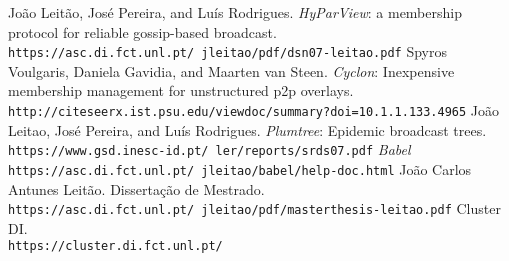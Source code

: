 

\begin{thebibliography}{9}

João Leitão, José Pereira, and Luís Rodrigues. 
\textit{HyParView}: a membership protocol for reliable gossip-based broadcast.
\\\texttt{https://asc.di.fct.unl.pt/~jleitao/pdf/dsn07-leitao.pdf}
Spyros Voulgaris, Daniela Gavidia, and Maarten van Steen. 
\textit{Cyclon}: Inexpensive membership management for unstructured p2p overlays.
\\\texttt{http://citeseerx.ist.psu.edu/viewdoc/summary?doi=10.1.1.133.4965}
João Leitao, José Pereira, and Luís Rodrigues. 
\textit{Plumtree}: Epidemic broadcast trees.
\\\texttt{https://www.gsd.inesc-id.pt/~ler/reports/srds07.pdf}
\textit{Babel}
\\\texttt{https://asc.di.fct.unl.pt/~jleitao/babel/help-doc.html}
João Carlos Antunes Leitão.
Dissertação de Mestrado.
\\\texttt{https://asc.di.fct.unl.pt/~jleitao/pdf/masterthesis-leitao.pdf}
Cluster DI.
\\\texttt{https://cluster.di.fct.unl.pt/}




\end{thebibliography}